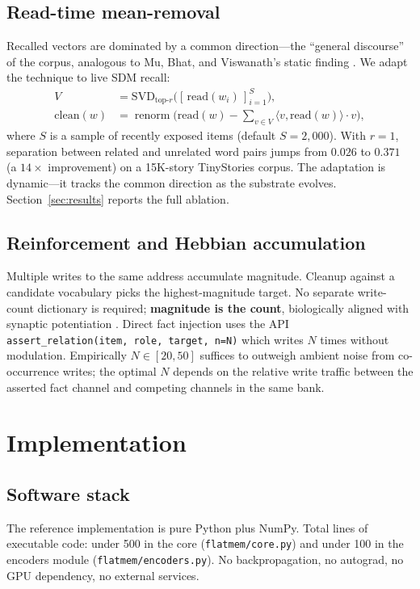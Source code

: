 \documentclass[11pt,a4paper]{article}
\begin{document}
\subsection{Read-time mean-removal}
Recalled vectors are dominated by a common direction---the ``general
discourse'' of the corpus, analogous to Mu, Bhat, and Viswanath's static
finding \cite{mu2017all}.  We adapt the technique to live SDM recall:
\begin{align}
  V &= \mathrm{SVD}_{\text{top-}r}\!\big([\,\mathrm{read}(w_i)\,]_{i=1}^{S}\big), \\
  \mathrm{clean}(w) &= \operatorname{renorm}\!\Big(
    \mathrm{read}(w) - \!\!\sum_{v \in V} \langle v, \mathrm{read}(w) \rangle \cdot v
  \Big),
  \label{eq:meanremove}
\end{align}
where $S$ is a sample of recently exposed items (default $S = 2{,}000$).
With $r = 1$, separation between related and unrelated word pairs jumps
from $0.026$ to $0.371$ (a $14\times$ improvement) on a 15K-story
TinyStories corpus.  The adaptation is dynamic---it tracks the common
direction as the substrate evolves.  Section~\ref{sec:results} reports
the full ablation.

\subsection{Reinforcement and Hebbian accumulation}
Multiple writes to the same address accumulate magnitude.  Cleanup
against a candidate vocabulary picks the highest-magnitude target.  No
separate write-count dictionary is required;  \textbf{magnitude is the
count}, biologically aligned with synaptic potentiation
\cite{bartol2015nanoconnectomic}.  Direct fact injection uses the API
\texttt{assert\_relation(item, role, target, n=N)} which writes $N$ times
without modulation.  Empirically $N \in [20, 50]$ suffices to outweigh
ambient noise from co-occurrence writes;  the optimal $N$ depends on the
relative write traffic between the asserted fact channel and competing
channels in the same bank.

\section{Implementation}
\label{sec:impl}

\subsection{Software stack}
The reference implementation is pure Python plus NumPy.  Total lines of
executable code:  under 500 in the core (\texttt{flatmem/core.py}) and
under 100 in the encoders module (\texttt{flatmem/encoders.py}).  No
backpropagation, no autograd, no GPU dependency, no external services.
\end{document}
